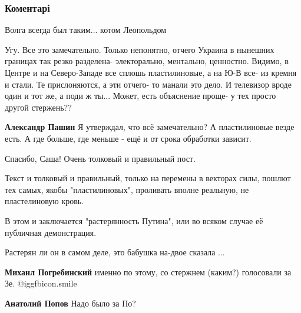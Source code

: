  
 
 
 
 
\subsubsection{Коментарі}

\begin{itemize} %
Волга всегда был таким... котом Леопольдом


Угу. Все это замечательно. Только непонятно, отчего Украина в нынешних границах
так резко разделена- электорально, ментально, ценностно. Видимо, в Центре и на
Северо-Западе все сплошь пластилиновые, а на Ю-В все- из кремня и стали. Те
прислоняются, а эти отчего- то манали это дело. И телевизор вроде один и тот
же, а поди ж ты... Может, есть объяснение проще- у тех просто другой стержень??

\begin{itemize} %
\textbf{Александр Пашин} Я утверждал, что всё замечательно? А пластилиновые везде есть. А где больше, где меньше - ещё и от срока обработки зависит.
\end{itemize} %


Спасибо, Саша! Очень толковый и правильный пост.

\begin{itemize} %

Текст и толковый и правильный, только на перемены в векторах силы, пошлют тех
самых, якобы "пластилиновых", проливать вполне реальную, не пластелиновую
кровь.

В этом и заключается "растерянность Путина", или во всяком случае её публичная
демонстрация.

Растерян ли он в самом деле, это бабушка на-двое сказала ...

\textbf{Михаил Погребинский} именно по этому, со стержнем (каким?) голосовали за Зе.  @igg{fbicon.smile} 

\textbf{Анатолий Попов} Надо было за По?


\end{itemize}
\end{itemize}
